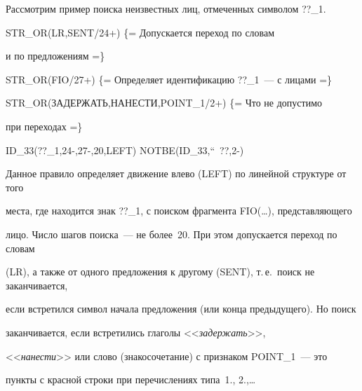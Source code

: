      Рассмотрим пример поиска неизвестных лиц, отмеченных символом {\sf ??\_1}.


     


     \smallskip


 


{\sf    STR\_OR(LR,SENT/24+) \{= Допускается переход по словам





 \hspace*{47mm}и по предложениям =\}





   STR\_OR(FIO/27+) \{= Определяет идентификацию ??\_1~--- с лицами =\}





   STR\_OR(ЗАДЕРЖАТЬ,НАНЕСТИ,POINT\_1/2+) \{= Что не допустимо


   


    \hspace*{90mm}при  переходах =\}





   ID\_33(??\_1,24-,27-,20,LEFT) NOTBE(ID\_33,``~??,2-)}


   


        \smallskip





     Данное правило определяет движение влево ({\sf LEFT}) по линейной структуре от того 


места, где находится знак {\sf ??\_1}, с поиском фрагмента {\sf FIO(\ldots)}, представляющего 


лицо. Число шагов поиска~--- не более~20. При этом допускается переход по словам 


({\sf LR}), а также от одного предложения к другому ({\sf SENT}), т.\,е.\ поиск не заканчивается, 


если встретился символ начала предложения (или конца предыдущего). Но поиск 


заканчивается, если встретились глаголы <<\textit{задержать}>>, 


<<\textit{нанести}>> или слово (знакосочетание) с признаком {\sf POINT\_1}~--- это 


пункты с красной строки при перечислениях типа~1., 2.,\ldots





